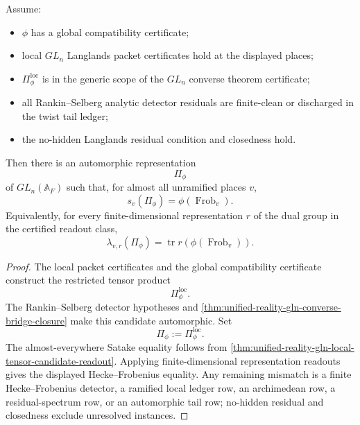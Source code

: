 \begin{theorem}
\label{thm:unified-reality-gln-global-reciprocity-converse-bridge}
Assume:
\begin{itemize}
\item $\phi$ has a global compatibility certificate;
\item local $GL_n$ Langlands packet certificates hold at the displayed
places;
\item $\Pi_{\phi}^{\mathrm{loc}}$ is in the generic scope of the
$GL_n$ converse theorem certificate;
\item all Rankin--Selberg analytic detector residuals are finite-clean
or discharged in the twist tail ledger;
\item the no-hidden Langlands residual condition and closedness hold.
\end{itemize}
Then there is an automorphic representation
$$
\Pi_{\phi}
$$
of $GL_n(\mathbb A_F)$ such that, for almost all unramified places $v$,
$$
s_v(\Pi_{\phi})=\phi(\operatorname{Frob}_v).
$$
Equivalently, for every finite-dimensional representation $r$ of the
dual group in the certified readout class,
$$
\lambda_{v,r}(\Pi_{\phi})
=
\operatorname{tr}r(\phi(\operatorname{Frob}_v)).
$$
\end{theorem}
\begin{proof}
The local packet certificates and the global compatibility certificate
construct the restricted tensor product
$$
\Pi_{\phi}^{\mathrm{loc}}.
$$
The Rankin--Selberg detector hypotheses and
\autoref{thm:unified-reality-gln-converse-bridge-closure} make this
candidate automorphic. Set
$$
\Pi_{\phi}:=\Pi_{\phi}^{\mathrm{loc}}.
$$
The almost-everywhere Satake equality follows from
\autoref{thm:unified-reality-gln-local-tensor-candidate-readout}.
Applying finite-dimensional representation readouts gives the displayed
Hecke--Frobenius equality. Any remaining mismatch is a finite
Hecke--Frobenius detector, a ramified local ledger row, an archimedean
row, a residual-spectrum row, or an automorphic tail row; no-hidden
residual and closedness exclude unresolved instances.
\end{proof}

